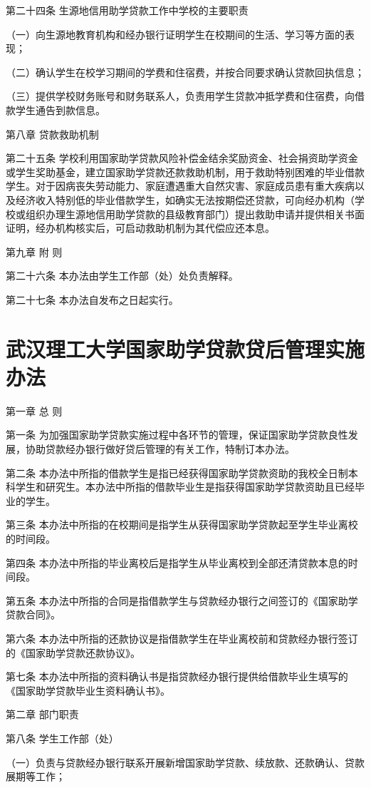 \documentclass[UTF8,12pt,a4paper]{report}
\begin{document}
第二十四条 生源地信用助学贷款工作中学校的主要职责

（一）向生源地教育机构和经办银行证明学生在校期间的生活、学习等方面的表现；

（二）确认学生在校学习期间的学费和住宿费，并按合同要求确认贷款回执信息；

（三）提供学校财务账号和财务联系人，负责用学生贷款冲抵学费和住宿费，向借款学生通告到款信息。

第八章 贷款救助机制

第二十五条 学校利用国家助学贷款风险补偿金结余奖励资金、社会捐资助学资金或学生奖助基金，建立国家助学贷款还款救助机制，用于救助特别困难的毕业借款学生。对于因病丧失劳动能力、家庭遭遇重大自然灾害、家庭成员患有重大疾病以及经济收入特别低的毕业借款学生，如确实无法按期偿还贷款，可向经办机构（学校或组织办理生源地信用助学贷款的县级教育部门）提出救助申请并提供相关书面证明，经办机构核实后，可启动救助机制为其代偿应还本息。

第九章 附 则

第二十六条 本办法由学生工作部（处）处负责解释。

第二十七条 本办法自发布之日起实行。
\chapter{武汉理工大学国家助学贷款贷后管理实施办法}
第一章 总 则

第一条 为加强国家助学贷款实施过程中各环节的管理，保证国家助学贷款良性发展，协助贷款经办银行做好贷后管理的有关工作，特制订本办法。

第二条 本办法中所指的借款学生是指已经获得国家助学贷款资助的我校全日制本科学生和研究生。本办法中所指的借款毕业生是指获得国家助学贷款资助且已经毕业的学生。

第三条 本办法中所指的在校期间是指学生从获得国家助学贷款起至学生毕业离校的时间段。

第四条 本办法中所指的毕业离校后是指学生从毕业离校到全部还清贷款本息的时间段。

第五条 本办法中所指的合同是指借款学生与贷款经办银行之间签订的《国家助学贷款合同》。

第六条 本办法中所指的还款协议是指借款学生在毕业离校前和贷款经办银行签订的《国家助学贷款还款协议》。

第七条 本办法中所指的资料确认书是指贷款经办银行提供给借款毕业生填写的《国家助学贷款毕业生资料确认书》。

第二章 部门职责

第八条 学生工作部（处）

（一）负责与贷款经办银行联系开展新增国家助学贷款、续放款、还款确认、贷款展期等工作；
\end{document}
